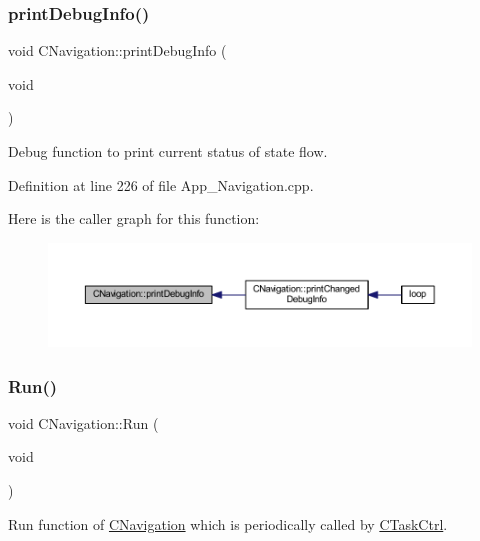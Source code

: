 \subsubsection{\texorpdfstring{print\+Debug\+Info()}{printDebugInfo()}}
{\footnotesize\ttfamily void C\+Navigation\+::print\+Debug\+Info (\begin{DoxyParamCaption}\item[{void}]{ }\end{DoxyParamCaption})\hspace{0.3cm}{\ttfamily [virtual]}}



Debug function to print current status of state flow. 



Definition at line 226 of file App\+\_\+\+Navigation.\+cpp.

Here is the caller graph for this function\+:\nopagebreak
\begin{figure}[H]
\begin{center}
\leavevmode
\includegraphics[width=350pt]{class_c_navigation_a84e320cd8975593ab6f966e8794b2886_icgraph}
\end{center}
\end{figure}
\mbox{\label{class_c_navigation_a86acb1521aab400e542465c8eabed671}} 
\subsubsection{\texorpdfstring{Run()}{Run()}}
{\footnotesize\ttfamily void C\+Navigation\+::\+Run (\begin{DoxyParamCaption}\item[{void}]{ }\end{DoxyParamCaption})\hspace{0.3cm}{\ttfamily [virtual]}}



Run function of \mbox{\hyperlink{class_c_navigation}{C\+Navigation}} which is periodically called by \mbox{\hyperlink{class_c_task_ctrl}{C\+Task\+Ctrl}}. 

